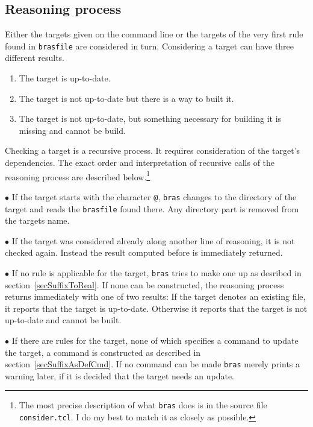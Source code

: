 \documentclass[11pt]{scrartcl}
\newcommand{\bras}{\texttt{bras}}
\begin{document}
\subsection{Reasoning process}
\label{secReasoning}
Either the targets given on the command line or the targets of the
very first rule found in \texttt{brasfile} are considered in
turn. Considering a target can have three different results. 
\begin{enumerate}
\item
The target is up-to-date.
\item
The target is not up-to-date but there is a way to built it.
\item
The target is not up-to-date, but something necessary for building it
is missing and cannot be build.
\end{enumerate}
Checking a target is a recursive process. It requires consideration of
the target's dependencies. The exact order and interpretation of
recursive calls of the reasoning process are described
below.\footnote{The most precise description of what \bras{} does is
  in the source file \texttt{consider.tcl}. I do my best to match it
  as closely as possible.}

$\bullet$ If the target starts with the character \texttt{@}, \bras{}
changes to the directory of the target and reads the \texttt{brasfile}
found there. Any directory part is removed from the targets name.

$\bullet$ If the target was considered already along another line of
reasoning, it is not checked again. Instead the result computed before
is immediately returned.

$\bullet$ If no rule is applicable for the target, \bras{} tries to
make one up as desribed in section~\ref{secSuffixToReal}. If none can be
constructed, the reasoning process returns immediately with one of two
results: If the target denotes an existing file, it reports that the
target is up-to-date. Otherwise it reports that the target is not
up-to-date and cannot be built.

$\bullet$ If there are rules for the target, none of which specifies a
command to update the target, a command is constructed as described in
section~\ref{secSuffixAsDefCmd}. If no command can be made \bras{}
merely prints a warning later, if it is decided that the target needs
an update.

\end{document}
